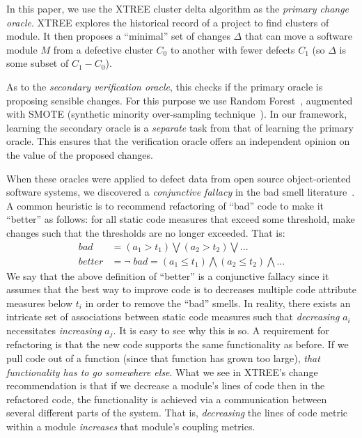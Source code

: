 \documentclass[twocolumn,5p]{elsarticle}
\theoremstyle{break}
\begin{document}
	In this paper, we use 
	the XTREE cluster delta algorithm as the {\em primary change  oracle}.
	XTREE 
	explores the historical record of a project to find clusters of module.
	It then proposes a ``minimal'' set of changes $\Delta$ that can move a software module $M$ from a defective cluster $C_0$ to another with fewer defects $C_1$ (so $\Delta$
	is some subset of $C_1 - C_0$). %
	
	As to 
	the {\em secondary verification oracle}, this  checks if the primary oracle is proposing
	sensible changes. For this purpose we use Random Forest~\cite{breiman2001random}, augmented with SMOTE (synthetic  minority over-sampling technique~\cite{chawla2002smote}).
	In our framework,  learning
	the secondary oracle is   a {\em separate} task from that of learning the primary
	oracle. This  ensures that the verification oracle offers an independent
	opinion on the value of the proposed changes.
	
	When these oracles were applied to defect data from
	open source object-oriented software systems, we discovered a {\em conjunctive fallacy}
	in the bad smell literature~\cite{erni96,bender99,Shatnawi10,Alves2010,hermans15}.
	A common heuristic is to recommend refactoring of ``bad'' code
	to make it ``better'' as follows: for all static code measures that exceed some threshold, make changes such that the thresholds are no longer exceeded. That is:
	\begin{equation}\label{eq:df}
		\scriptstyle
		\begin{array}{rl}
			\mathit{bad}    & = \left(a_1 > t_1 \right) \bigvee \left(a_2 > t_2\right) \bigvee    ...                             \\
			\mathit{better} & = \neg\;\mathit{bad} = \left(a_1 \le t_1 \right) \bigwedge \left(a_2 \le t_2\right)  \bigwedge  ... 
		\end{array}
	\end{equation}
	We say that the above definition of ``better'' is a conjunctive fallacy
	since it assumes that the best way to improve code is to decreases multiple code attribute measures below $t_i$ in order
	to remove the ``bad'' smells. In reality, there exists an intricate set of associations between static code measures
	such that {\em decreasing}  $a_i$ necessitates {\em increasing} $a_j$.
	It is easy to see why this is so.
	A requirement for  refactoring is that the new code supports the same functionality
	as before. If we pull code out of a function (since that function has grown too
	large), {\em that functionality has to go somewhere else}. What we see in XTREE's change
	recommendation is that if we decrease a module's lines of code  then in the refactored
	code, the functionality is achieved via a communication between several different parts
	of the system. That is, {\em decreasing} the lines of code metric within a module {\em increases}
	that module's coupling metrics.
	
\end{document}
